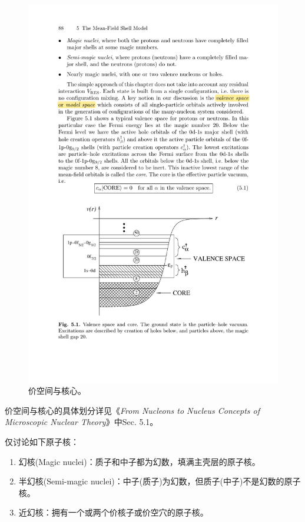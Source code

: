 \begin{figure}[htbp]
    \centering
    \setlength{\abovecaptionskip}{0.2cm}
    \includegraphics[scale=1.2]{figure/nuclear/valence-space.pdf}
    \caption{价空间与核心。}
    \label{fig:valence-space}
\end{figure}
价空间与核心的具体划分详见《\textit{From Nucleons to Nucleus Concepts of Microscopic Nuclear Theory}》中Sec. 5.1。

仅讨论如下原子核：
\begin{enumerate}
    \item 幻核(Magic nuclei)：质子和中子都为幻数，填满主壳层的原子核。
    \item 半幻核(Semi-magic nuclei)：中子(质子)为幻数，但质子(中子)不是幻数的原子核。
    \item 近幻核：拥有一个或两个价核子或价空穴的原子核。
\end{enumerate}


